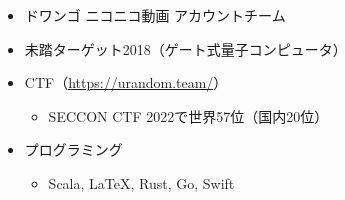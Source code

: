 \begin{frame}
\begin{columns}
\begin{column}{0.7\textwidth}
\begin{itemize}
        \item ドワンゴ ニコニコ動画 アカウントチーム

        \item 未踏ターゲット2018（ゲート式量子コンピュータ）

        \item CTF（\url{https://urandom.team/}）
        \begin{itemize}
          \item SECCON CTF 2022で世界57位（国内20位）
        \end{itemize}

        \item プログラミング
        \begin{itemize}
          \item Scala, \LaTeX, Rust, Go, Swift
        \end{itemize}
      \end{itemize}

    \end{column}
  \end{columns}
\end{frame}

